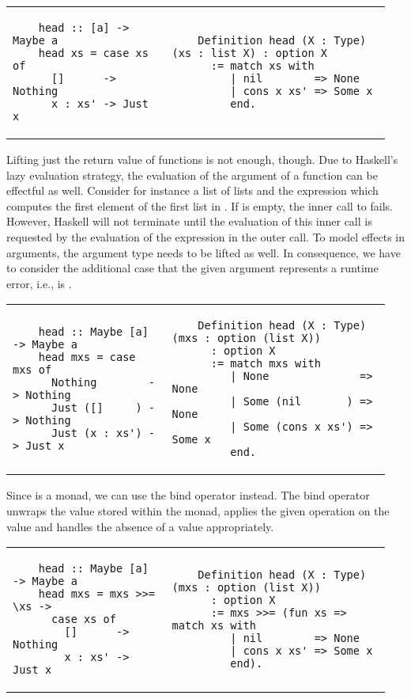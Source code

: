 \begin{tabular}{p{0.40\linewidth} | p{0.55\linewidth}}
  \begin{verbatim}
    head :: [a] -> Maybe a
    head xs = case xs of
      []      -> Nothing
      x : xs' -> Just x
  \end{verbatim}
  &
  \begin{verbatim}
    Definition head (X : Type) (xs : list X) : option X
      := match xs with
         | nil        => None
         | cons x xs' => Some x
         end.
  \end{verbatim}
\end{tabular}

Lifting just the return value of functions is not enough, though.
Due to Haskell's lazy evaluation strategy, the evaluation of the argument of a function can be effectful as well.
Consider for instance a list of lists  and the expression  which computes the first element of the first list in .
If  is empty, the inner call to  fails.
However, Haskell will not terminate until the evaluation of this inner call is requested by the evaluation of the  expression in the outer call.
To model effects in arguments, the argument type needs to be lifted as well.
In consequence, we have to consider the additional case that the given argument represents a runtime error, i.e., is .

\begin{tabular}{p{0.40\linewidth} | p{0.55\linewidth}}
  \begin{verbatim}
    head :: Maybe [a] -> Maybe a
    head mxs = case mxs of
      Nothing        -> Nothing
      Just ([]     ) -> Nothing
      Just (x : xs') -> Just x
  \end{verbatim}
  &
  \begin{verbatim}
    Definition head (X : Type) (mxs : option (list X))
      : option X
      := match mxs with
         | None              => None
         | Some (nil       ) => None
         | Some (cons x xs') => Some x
         end.
  \end{verbatim}
\end{tabular}

Since  is a monad, we can use the bind operator instead.
The bind operator unwraps the value stored within the monad, applies the given operation on the value and handles the absence of a value appropriately.

\begin{tabular}{p{0.40\linewidth} | p{0.55\linewidth}}
  \begin{verbatim}
    head :: Maybe [a] -> Maybe a
    head mxs = mxs >>= \xs ->
      case xs of
        []      -> Nothing
        x : xs' -> Just x
  \end{verbatim}
  &
  \begin{verbatim}
    Definition head (X : Type) (mxs : option (list X))
      : option X
      := mxs >>= (fun xs => match xs with
         | nil        => None
         | cons x xs' => Some x
         end).
  \end{verbatim}
\end{tabular}

